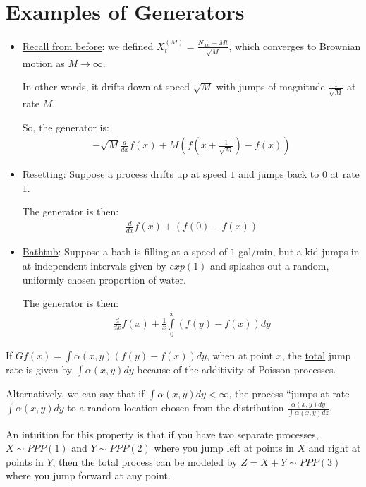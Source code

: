 \documentclass[12pt]{article}
\begin{document}
\section{Examples of Generators}
\begin{itemize}
\item \underline{Recall from before}: we defined $X_t^{(M)} = \frac{N_{Mt} - Mt}{\sqrt{M}}$, which converges to Brownian motion as $M\rightarrow\infty$.

In other words, it drifts down at speed $\sqrt{M}$ with jumps of magnitude $\frac{1}{\sqrt{M}}$ at rate $M$.

So, the generator is:
$$\begin{aligned}
-\sqrt{M} \frac{d}{dx} f(x) + M\left( f(x + \frac{1}{\sqrt{M}}) - f(x) \right)
\end{aligned}$$

\item \underline{Resetting}: Suppose a process drifts up at speed $1$ and jumps back to $0$ at rate $1$.

The generator is then:
$$\begin{aligned}
\frac{d}{dx} f(x) + \left( f(0) - f(x) \right)
\end{aligned}$$

\item \underline{Bathtub}: Suppose a bath is filling at a speed of $1$ gal/min, but a kid jumps in at independent intervals given by $exp(1)$ and splashes out a random, uniformly chosen proportion of water.

The generator is then:
$$\begin{aligned}
\frac{d}{dx} f(x) + \frac{1}{x} \int\limits_0^x \left( f(y) - f(x) \right) dy
\end{aligned}$$

\end{itemize}

\begin{note} If $G f(x) = \int \alpha(x, y) \left( f(y) - f(x)  \right) dy$, when at point $x$, the \underline{total} jump rate is given by $\int \alpha(x, y) dy$ because of the additivity of Poisson processes.

Alternatively, we can say that if $\int \alpha(x, y)dy < \infty$, the process ``jumps at rate $\int \alpha(x, y)dy$ to a random location chosen from the distribution $\frac{\alpha(x, y) dy}{\int \alpha(x, y) dz}$.

An intuition for this property is that if you have two separate processes, $X\sim PPP(1)$ and $Y\sim PPP(2)$ where you jump left at points in $X$ and right at points in $Y$, then the total process can be modeled by $Z=X+Y\sim PPP(3)$ where you jump forward at any point.
\end{note}
\end{document}
